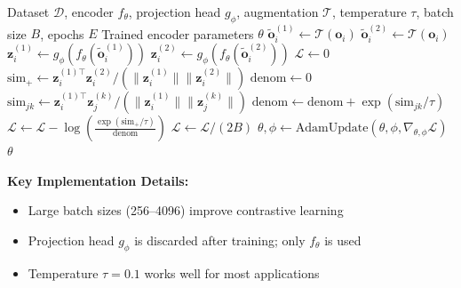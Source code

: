 \begin{algorithm}[H]
\caption{SimCLR Contrastive Learning}
\label{alg:simclr}
\begin{algorithmic}[1]
\REQUIRE Dataset $\mathcal{D}$, encoder $f_\theta$, projection head $g_\phi$, augmentation $\mathcal{T}$, temperature $\tau$, batch size $B$, epochs $E$
\ENSURE Trained encoder parameters $\theta$
        \STATE {}
            \STATE $\tilde{\mathbf{o}}_i^{(1)} \gets \mathcal{T}(\mathbf{o}_i)$ 
            \STATE $\tilde{\mathbf{o}}_i^{(2)} \gets \mathcal{T}(\mathbf{o}_i)$ 
        \ENDFOR
        \STATE
        \STATE {}
            \STATE $\mathbf{z}_i^{(1)} \gets g_\phi(f_\theta(\tilde{\mathbf{o}}_i^{(1)}))$
            \STATE $\mathbf{z}_i^{(2)} \gets g_\phi(f_\theta(\tilde{\mathbf{o}}_i^{(2)}))$
        \ENDFOR
        \STATE
        \STATE {}
        \STATE $\mathcal{L} \gets 0$
            \STATE {}
            \STATE $\text{sim}_{+} \gets \mathbf{z}_i^{(1)\top} \mathbf{z}_i^{(2)} / (\|\mathbf{z}_i^{(1)}\| \|\mathbf{z}_i^{(2)}\|)$
            \STATE $\text{denom} \gets 0$
                        \STATE $\text{sim}_{jk} \gets \mathbf{z}_i^{(1)\top} \mathbf{z}_j^{(k)} / (\|\mathbf{z}_i^{(1)}\| \|\mathbf{z}_j^{(k)}\|)$
                        \STATE $\text{denom} \gets \text{denom} + \exp(\text{sim}_{jk} / \tau)$
                    \ENDIF
                \ENDFOR
            \ENDFOR
            \STATE $\mathcal{L} \gets \mathcal{L} - \log\left(\frac{\exp(\text{sim}_{+} / \tau)}{\text{denom}}\right)$
        \ENDFOR
        \STATE $\mathcal{L} \gets \mathcal{L} / (2B)$
        \STATE
        \STATE {}
        \STATE $\theta, \phi \gets \text{AdamUpdate}(\theta, \phi, \nabla_{\theta, \phi} \mathcal{L})$
    \ENDFOR
\ENDFOR
\RETURN $\theta$
\end{algorithmic}
\end{algorithm}

\textbf{Key Implementation Details:}
\begin{itemize}
    \item Large batch sizes (256--4096) improve contrastive learning
    \item Projection head $g_\phi$ is discarded after training; only $f_\theta$ is used
    \item Temperature $\tau = 0.1$ works well for most applications
\end{itemize}

